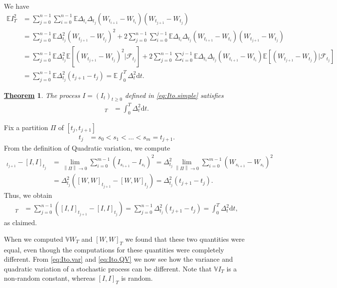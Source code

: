 \documentclass[12pt]{book}
\numberwithin{equation}{chapter}
\theoremstyle{plain}
\newtheorem{theorem}{\underline{Theorem}}
\numberwithin{theorem}{section}
\theoremstyle{definition}
\numberwithin{exercise}{chapter}
\let\oldendproof\endproof
\renewenvironment{proof}[1][\proofname]{%
  \oldproof[\scshape\underline{#1}]%
}{\oldendproof}
\newcommand{\<}{\langle}
\renewcommand{\>}{\rangle}
\renewcommand{\(}{\left(}
\renewcommand{\)}{\right)}
\renewcommand{\[}{\left[}
\renewcommand{\]}{\right]}
\newcommand\Eb{\mathds{E}}
\newcommand\Vb{\mathds{V}}
\newcommand\Fc{\mathscr{F}}
\newcommand\Del{\Delta}
\newcommand\dd{\mathrm{d}}
\newcommand{\norm}[1]{\left\|#1\right\|}
\begin{document}
\begin{proof}
We have
\begin{align}
\Eb I_T^2
	&=	\sum_{j=0}^{n-1} \sum_{i=0}^{n-1} \Eb \Del_{t_i} \Del_{t_j} ( W_{t_{i+1}} - W_{t_i} )  ( W_{t_{j+1}} - W_{t_j} ) \\
	&=	\sum_{j=0}^{n-1} \Eb \Del_{t_j}^2 ( W_{t_{j+1}} - W_{t_j} )^2
			+ 2 \sum_{j=0}^{n-1} \sum_{i=0}^{j-1} \Eb \Del_{t_i} \Del_{t_j} ( W_{t_{i+1}} - W_{t_i} )  ( W_{t_{j+1}} - W_{t_j} ) \\
	&=	\sum_{j=0}^{n-1} \Eb \Del_{t_j}^2 \Eb[  ( W_{t_{j+1}} - W_{t_j} )^2 | \Fc_{t_j}]
			+ 2 \sum_{j=0}^{n-1} \sum_{i=0}^{j-1} \Eb \Del_{t_i} \Del_{t_j} ( W_{t_{i+1}} - W_{t_i} )  \Eb[ ( W_{t_{j+1}} - W_{t_j} ) | \Fc_{t_j} ] \\
	&=	\sum_{j=0}^{n-1} \Eb \Del_{t_j}^2 ( {t_{j+1}} - {t_j} )
	=		\Eb \int_0^T \Del_t^2 \dd t .
\end{align}
\end{proof}

\begin{theorem}
\label{thm:ito.integral.QV}
The process $I = (I_t)_{t \geq 0}$ defined in \eqref{eq:Ito.simple} satisfies
\begin{align}
[I,I]_T 
	&=  \int_0^T \Del_t^2 \dd t. \label{eq:Ito.QV}
\end{align}
\end{theorem}

\begin{proof}
Fix a partition $\Pi$ of $[t_j,t_{j+1}]$
\begin{align}
 t_j 
	&= s_0 < s_1 < \ldots < s_m = t_{j+1} .
\end{align}
From the definition of Quadratic variation, we compute
\begin{align}
[I,I]_{t_{j+1}}-[I,I]_{t_j}
	&=	\lim_{\norm{\Pi} \to 0 } \sum_{i=0}^{m-1} \( I_{s_{i+1}} - I_{s_i} \)^2
	=		\Del_{t_j}^2 \lim_{\norm{\Pi} \to 0 }  \sum_{i=0}^{m-1} \( W_{s_{i+1}} - W_{s_i} \)^2 \\
	&=	\Del_{t_j}^2 \( [W,W]_{t_{j+1}} - [W,W]_{t_j} \)
	=		\Del_{t_j}^2 \( {t_{j+1}} - {t_j} \) .
\end{align}
Thus, we obtain
\begin{align}
[I,I]_T
	&=	\sum_{j=0}^{n-1} \( [I,I]_{t_{j+1}}-[I,I]_{t_j} \)
	=		\sum_{j=0}^{n-1} \Del_{t_j}^2 \( {t_{j+1}} - {t_j} \)
	=		\int_0^T \Del_t^2 \dd t ,
\end{align}
as claimed.
\end{proof}

\noindent
When we computed $\Vb W_T$ and $[W,W]_T$ we found that these two quantities were equal, even though the computations for these quantities were completely different.
From \eqref{eq:Ito.var} and \eqref{eq:Ito.QV} we now see how the variance and quadratic variation of a stochastic process can be different.  Note that $\Vb I_T$ is a non-random constant, whereas $[I,I]_T$ is random.
\end{document}
